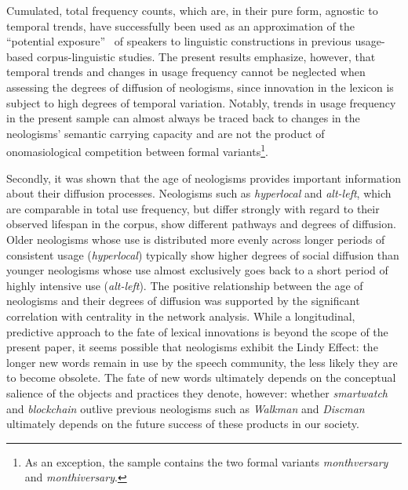 \documentclass[
  a4paper,
  abstract=on,
  captions=tableabove,
  ]{scrartcl}
\newcommand{\ol}[1]{\emph{#1}}
\begin{document}
    Cumulated, total frequency counts, which are, in their pure form, agnostic to temporal trends, have successfully been used as an approximation of the \enquote{potential exposure}~\parencite{Stefanowitsch2017CorpusbasedPerspective} of speakers to linguistic constructions in previous usage-based corpus-linguistic studies. The present results emphasize, however, that temporal trends and changes in usage frequency cannot be neglected when assessing the degrees of diffusion of neologisms, since innovation in the lexicon is subject to high degrees of temporal variation. Notably, trends in usage frequency in the present sample can almost always be traced back to changes in the neologisms' semantic carrying capacity and are not the product of onomasiological competition between formal variants\footnote{As an exception, the sample contains the two formal variants \ol{monthversary} and \ol{monthiversary}.}.

    Secondly, it was shown that the age of neologisms provides important information about their diffusion processes. Neologisms such as \ol{hyperlocal} and \ol{alt-left}, which are comparable in total use frequency, but differ strongly with regard to their observed lifespan in the corpus, show different pathways and degrees of diffusion. Older neologisms whose use is distributed more evenly across longer periods of consistent usage (\ol{hyperlocal}) typically show higher degrees of social diffusion than younger neologisms whose use almost exclusively goes back to a short period of highly intensive use (\ol{alt-left}). The positive relationship between the age of neologisms and their degrees of diffusion was supported by the significant correlation with centrality in the network analysis. While a longitudinal, predictive approach to the fate of lexical innovations is beyond the scope of the present paper, it seems possible that neologisms exhibit the Lindy Effect: the longer new words remain in use by the speech community, the less likely they are to become obsolete. The fate of new words ultimately depends on the conceptual salience of the objects and practices they denote, however: whether \ol{smartwatch} and \ol{blockchain} outlive previous neologisms such as \ol{Walkman} and \ol{Discman} ultimately depends on the future success of these products in our society.
\end{document}
